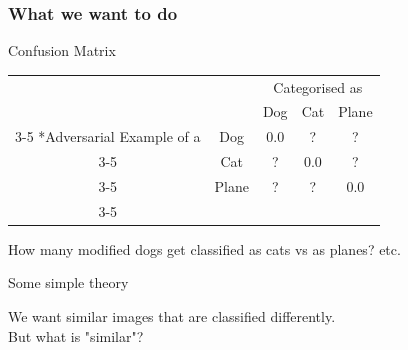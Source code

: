 \documentclass[10pt,usepdftitle=false,aspectratio=169]{beamer}
\begin{document}
\begin{frame}[fragile]
	\frametitle{What we want to do}
	\begin{block}{Confusion Matrix}
		\begin{table}
			\setlength{\extrarowheight}{2pt}
			\begin{tabular}{cc|c|c|c|}
				& \multicolumn{1}{c}{} & \multicolumn{3}{c}{Categorised as}\\
				& \multicolumn{1}{c}{} & \multicolumn{1}{c}{Dog}  & \multicolumn{1}{c}{Cat} & \multicolumn{1}{c}{Plane} \\\cline{3-5}
				\multirow{3}*{Adversarial Example of a}  & Dog & 0.0 & ? & ?\\\cline{3-5}
				& Cat & ? & 0.0 &  ? \\\cline{3-5}
				& Plane & ? & ? &  0.0 \\\cline{3-5}
			\end{tabular}
		\end{table}
		How many modified dogs get classified as cats vs as planes? etc.
	\end{block}
\end{frame}

\begin{frame}[plain]
	\huge Some simple theory
\end{frame}	

\begin{frame}[plain]
	\large We want similar images that are classified differently.\\
	But what is "similar"?
\end{frame}	
\end{document}
